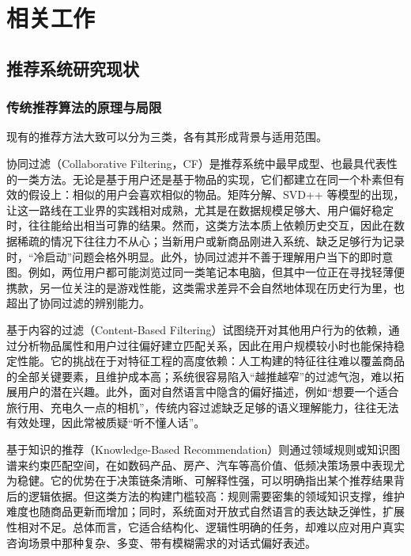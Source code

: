 \documentclass{nkuthesis}
\begin{document}
\section{相关工作}

\subsection{推荐系统研究现状}

\subsubsection{传统推荐算法的原理与局限}

现有的推荐方法大致可以分为三类，各有其形成背景与适用范围。

协同过滤（Collaborative Filtering，CF）是推荐系统中最早成型、也最具代表性的一类方法。无论是基于用户还是基于物品的实现，它们都建立在同一个朴素但有效的假设上：相似的用户会喜欢相似的物品。矩阵分解、SVD++ 等模型的出现，让这一路线在工业界的实践相对成熟，尤其是在数据规模足够大、用户偏好稳定时，往往能给出相当可靠的结果。然而，这类方法本质上依赖历史交互，因此在数据稀疏的情况下往往力不从心；当新用户或新商品刚进入系统、缺乏足够行为记录时，“冷启动”问题会格外明显。此外，协同过滤并不善于理解用户当下的即时意图。例如，两位用户都可能浏览过同一类笔记本电脑，但其中一位正在寻找轻薄便携款，另一位关注的是游戏性能，这类需求差异不会自然地体现在历史行为里，也超出了协同过滤的辨别能力。

基于内容的过滤（Content-Based Filtering）试图绕开对其他用户行为的依赖，通过分析物品属性和用户过往偏好建立匹配关系，因此在用户规模较小时也能保持稳定性能。它的挑战在于对特征工程的高度依赖：人工构建的特征往往难以覆盖商品的全部关键要素，且维护成本高；系统很容易陷入“越推越窄”的过滤气泡，难以拓展用户的潜在兴趣。此外，面对自然语言中隐含的偏好描述，例如“想要一个适合旅行用、充电久一点的相机”，传统内容过滤缺乏足够的语义理解能力，往往无法有效处理，因此常被质疑“听不懂人话”。

基于知识的推荐（Knowledge-Based Recommendation）则通过领域规则或知识图谱来约束匹配空间，在如数码产品、房产、汽车等高价值、低频决策场景中表现尤为稳健。它的优势在于决策链条清晰、可解释性强，可以明确指出某个推荐结果背后的逻辑依据。但这类方法的构建门槛较高：规则需要密集的领域知识支撑，维护难度也随商品更新而增加；同时，系统面对开放式自然语言的表达缺乏弹性，扩展性相对不足。总体而言，它适合结构化、逻辑性明确的任务，却难以应对用户真实咨询场景中那种复杂、多变、带有模糊需求的对话式偏好表述。
\end{document}
